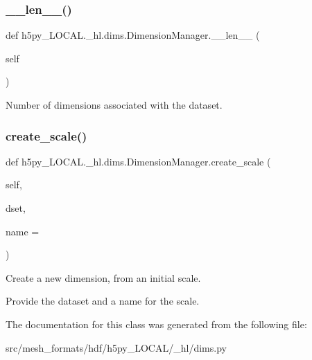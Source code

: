 \subsubsection{\texorpdfstring{\+\_\+\+\_\+len\+\_\+\+\_\+()}{\_\_len\_\_()}}
{\footnotesize\ttfamily def h5py\+\_\+\+L\+O\+C\+A\+L.\+\_\+hl.\+dims.\+Dimension\+Manager.\+\_\+\+\_\+len\+\_\+\+\_\+ (\begin{DoxyParamCaption}\item[{}]{self }\end{DoxyParamCaption})}

\begin{DoxyVerb}Number of dimensions associated with the dataset. \end{DoxyVerb}
 \mbox{\label{classh5py__LOCAL_1_1__hl_1_1dims_1_1DimensionManager_ab57c0677bed53187340f92a97a255773}} 
\subsubsection{\texorpdfstring{create\+\_\+scale()}{create\_scale()}}
{\footnotesize\ttfamily def h5py\+\_\+\+L\+O\+C\+A\+L.\+\_\+hl.\+dims.\+Dimension\+Manager.\+create\+\_\+scale (\begin{DoxyParamCaption}\item[{}]{self,  }\item[{}]{dset,  }\item[{}]{name = {\ttfamily \textquotesingle{}\textquotesingle{}} }\end{DoxyParamCaption})}

\begin{DoxyVerb}Create a new dimension, from an initial scale.

Provide the dataset and a name for the scale.
\end{DoxyVerb}
 

The documentation for this class was generated from the following file\+:\begin{DoxyCompactItemize}
\item 
src/mesh\+\_\+formats/hdf/h5py\+\_\+\+L\+O\+C\+A\+L/\+\_\+hl/dims.\+py\end{DoxyCompactItemize}
